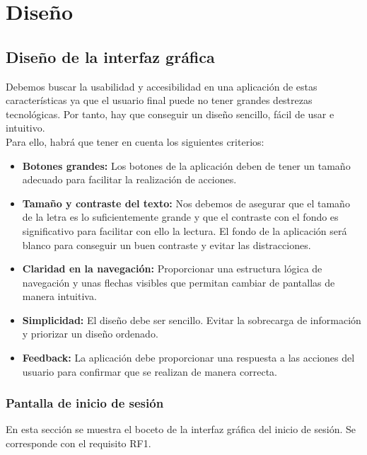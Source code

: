 \chapter{Diseño}
\label{chap:design}

\section{Diseño de la interfaz gráfica}

Debemos buscar la usabilidad y accesibilidad en una aplicación de estas características ya que el usuario final puede no tener grandes destrezas tecnológicas. Por tanto, hay que conseguir un diseño sencillo, fácil de usar e intuitivo. \\

Para ello, habrá que tener en cuenta los siguientes criterios:

\begin{itemize}
	\item \textbf{Botones grandes:} Los botones de la aplicación deben de tener un tamaño adecuado para facilitar la realización de acciones. 
	\item \textbf{Tamaño y contraste del texto:} Nos debemos de asegurar que el tamaño de la letra es lo suficientemente grande y que el contraste con el fondo es significativo para facilitar con ello la lectura. El fondo de la aplicación será blanco para conseguir un buen contraste y evitar las distracciones. 
	\item \textbf{Claridad en la navegación:} Proporcionar una estructura lógica de navegación y unas flechas visibles que permitan cambiar de pantallas de manera intuitiva. 
	\item \textbf{Simplicidad:} El diseño debe ser sencillo. Evitar la sobrecarga de información y priorizar un diseño ordenado. 
	\item \textbf{Feedback:} La aplicación debe proporcionar una respuesta a las acciones del usuario para confirmar que se realizan de manera correcta. 
\end{itemize} 


\subsection{Pantalla de inicio de sesión}

En esta sección se muestra el boceto de la interfaz gráfica del inicio de sesión. Se corresponde con el requisito RF1. 

